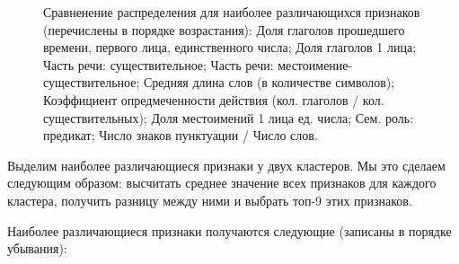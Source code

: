 \documentclass[12pt]{article}
\begin{document}
\begin{figure}[ht!]
\vspace{2ex}
\centering {}  
\vspace{1ex}
\caption{Сравненение распределения для наиболее различающихся признаков (перечислены в порядке возрастания): 
 Доля глаголов прошедшего времени, первого лица, единственного числа; 
 Доля глаголов 1 лица; 
 Часть речи: существительное; 
 Часть речи: местоимение-существительное; 
 Средняя длина слов (в количестве символов); 
 Коэффициент опредмеченности действия (кол. глаголов / кол. существительных); 
 Доля местоимений 1 лица ед. числа; 
 Сем. роль: предикат; 
 Число знаков пунктуации / Число слов.} \label{hist1}
\end{figure}

Выделим наиболее различающиеся признаки у двух кластеров. Мы это сделаем следующим образом: высчитать среднее значение всех признаков для каждого кластера, получить разницу между ними и выбрать топ-9 этих признаков.

Наиболее различающиеся признаки получаются следующие (записаны в порядке убывания):
\end{document}

